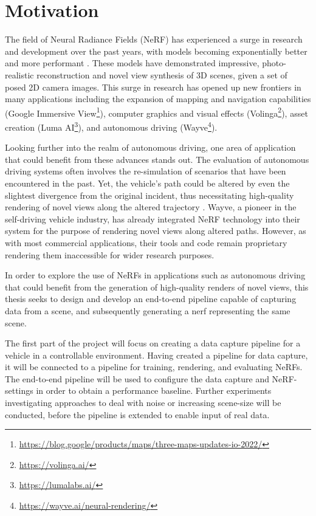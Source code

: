 \section{Motivation}
The field of Neural Radiance Fields (NeRF) has experienced a surge in research and development over the past years, with models becoming exponentially better and more performant \cite{debbagh_neural_2023}. These models have demonstrated impressive, photo-realistic reconstruction and novel view synthesis of 3D scenes, given a set of posed 2D camera images. This surge in research has opened up new frontiers in many applications including the expansion of mapping and navigation capabilities (Google Immersive View\footnote{\url{https://blog.google/products/maps/three-maps-updates-io-2022/}}), computer graphics and visual effects (Volinga\footnote{\url{https://volinga.ai/}}), asset creation (Luma AI\footnote{\url{https://lumalabs.ai/}}), and autonomous driving (Wayve\footnote{\url{https://wayve.ai/neural-rendering/}}). 

Looking further into the realm of autonomous driving, one area of application that could benefit from these advances stands out. The evaluation of autonomous driving systems often involves the re-simulation of scenarios that have been encountered in the past. Yet, the vehicle's path could be altered by even the slightest divergence from the original incident, thus necessitating high-quality rendering of novel views along the altered trajectory \cite{tancikBlockNeRFScalableLarge2022}. Wayve, a pioneer in the self-driving vehicle industry, has already integrated NeRF technology into their system for the purpose of rendering novel views along altered paths. However, as with most commercial applications, their tools and code remain proprietary rendering them inaccessible for wider research purposes.

In order to explore the use of NeRFs in applications such as autonomous driving that could benefit from the generation of high-quality renders of novel views, this thesis seeks to design and develop an end-to-end pipeline capable of capturing data from a scene, and subsequently generating a \acrshort{nerf} representing the same scene. 

The first part of the project will focus on creating a data capture pipeline for a vehicle in a controllable environment. Having created a pipeline for data capture, it will be connected to a pipeline for training, rendering, and evaluating NeRFs. The end-to-end pipeline will be used to configure the data capture and NeRF-settings in order to obtain a performance baseline. Further experiments investigating approaches to deal with noise or increasing scene-size will be conducted, before the pipeline is extended to enable input of real data.

